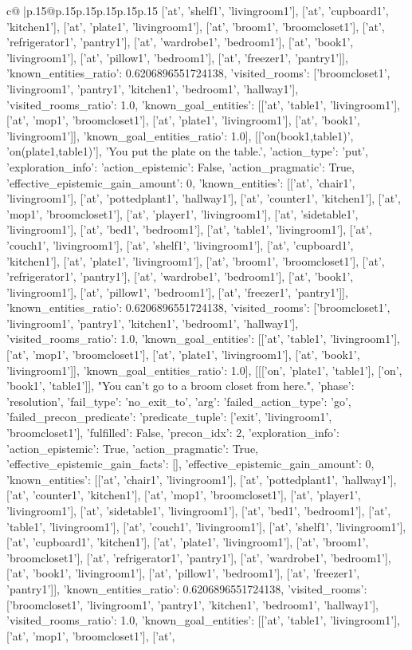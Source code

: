 \documentclass{article}
\begin{document}
{\begin{supertabular}{c@{$\;$}|p{.15\linewidth}@{}p{.15\linewidth}p{.15\linewidth}p{.15\linewidth}p{.15\linewidth}p{.15\linewidth}}
{{{['at', 'shelf1', 'livingroom1'], ['at', 'cupboard1', 'kitchen1'], ['at', 'plate1', 'livingroom1'], ['at', 'broom1', 'broomcloset1'], ['at', 'refrigerator1', 'pantry1'], ['at', 'wardrobe1', 'bedroom1'], ['at', 'book1', 'livingroom1'], ['at', 'pillow1', 'bedroom1'], ['at', 'freezer1', 'pantry1']], 'known_entities_ratio': 0.6206896551724138, 'visited_rooms': ['broomcloset1', 'livingroom1', 'pantry1', 'kitchen1', 'bedroom1', 'hallway1'], 'visited_rooms_ratio': 1.0, 'known_goal_entities': [['at', 'table1', 'livingroom1'], ['at', 'mop1', 'broomcloset1'], ['at', 'plate1', 'livingroom1'], ['at', 'book1', 'livingroom1']], 'known_goal_entities_ratio': 1.0}}], [['on(book1,table1)', 'on(plate1,table1)'], 'You put the plate on the table.', {'action_type': 'put', 'exploration_info': {'action_epistemic': False, 'action_pragmatic': True, 'effective_epistemic_gain_amount': 0, 'known_entities': [['at', 'chair1', 'livingroom1'], ['at', 'pottedplant1', 'hallway1'], ['at', 'counter1', 'kitchen1'], ['at', 'mop1', 'broomcloset1'], ['at', 'player1', 'livingroom1'], ['at', 'sidetable1', 'livingroom1'], ['at', 'bed1', 'bedroom1'], ['at', 'table1', 'livingroom1'], ['at', 'couch1', 'livingroom1'], ['at', 'shelf1', 'livingroom1'], ['at', 'cupboard1', 'kitchen1'], ['at', 'plate1', 'livingroom1'], ['at', 'broom1', 'broomcloset1'], ['at', 'refrigerator1', 'pantry1'], ['at', 'wardrobe1', 'bedroom1'], ['at', 'book1', 'livingroom1'], ['at', 'pillow1', 'bedroom1'], ['at', 'freezer1', 'pantry1']], 'known_entities_ratio': 0.6206896551724138, 'visited_rooms': ['broomcloset1', 'livingroom1', 'pantry1', 'kitchen1', 'bedroom1', 'hallway1'], 'visited_rooms_ratio': 1.0, 'known_goal_entities': [['at', 'table1', 'livingroom1'], ['at', 'mop1', 'broomcloset1'], ['at', 'plate1', 'livingroom1'], ['at', 'book1', 'livingroom1']], 'known_goal_entities_ratio': 1.0}}], [[['on', 'plate1', 'table1'], ['on', 'book1', 'table1']], "You can't go to a broom closet from here.", {'phase': 'resolution', 'fail_type': 'no_exit_to', 'arg': {'failed_action_type': 'go', 'failed_precon_predicate': {'predicate_tuple': ['exit', 'livingroom1', 'broomcloset1'], 'fulfilled': False, 'precon_idx': 2}}, 'exploration_info': {'action_epistemic': True, 'action_pragmatic': True, 'effective_epistemic_gain_facts': [], 'effective_epistemic_gain_amount': 0, 'known_entities': [['at', 'chair1', 'livingroom1'], ['at', 'pottedplant1', 'hallway1'], ['at', 'counter1', 'kitchen1'], ['at', 'mop1', 'broomcloset1'], ['at', 'player1', 'livingroom1'], ['at', 'sidetable1', 'livingroom1'], ['at', 'bed1', 'bedroom1'], ['at', 'table1', 'livingroom1'], ['at', 'couch1', 'livingroom1'], ['at', 'shelf1', 'livingroom1'], ['at', 'cupboard1', 'kitchen1'], ['at', 'plate1', 'livingroom1'], ['at', 'broom1', 'broomcloset1'], ['at', 'refrigerator1', 'pantry1'], ['at', 'wardrobe1', 'bedroom1'], ['at', 'book1', 'livingroom1'], ['at', 'pillow1', 'bedroom1'], ['at', 'freezer1', 'pantry1']], 'known_entities_ratio': 0.6206896551724138, 'visited_rooms': ['broomcloset1', 'livingroom1', 'pantry1', 'kitchen1', 'bedroom1', 'hallway1'], 'visited_rooms_ratio': 1.0, 'known_goal_entities': [['at', 'table1', 'livingroom1'], ['at', 'mop1', 'broomcloset1'], ['at', }}}
\end{supertabular}}
\end{document}
